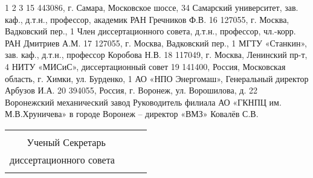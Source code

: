 1	2	3
15	443086, г. Самара, Московское шоссе, 34
Самарский университет, зав. каф., д.т.н., профессор, академик РАН 
Гречников Ф.В.
16	127055, г. Москва, Вадковский пер., 1 	Член диссертационного совета, 
д.т.н., профессор, чл.-корр. РАН 
Дмитриев А.М.
17	127055, г. Москва, Вадковский пер., 1 	МГТУ «Станкин», зав. каф., 
д.т.н., профессор Коробова Н.В.
18	117049, г. Москва, Ленинский пр-т, 4	НИТУ «МИСиС», 
диссертационный совет
19	141400, Россия, Московская область, 
г. Химки, ул. Бурденко, 1	АО «НПО Энергомаш»,
Генеральный директор Арбузов И.А.
20	394055, Россия, г. Воронеж,
ул. Ворошилова, д. 22	Воронежский механический завод
Руководитель филиала АО «ГКНПЦ им. М.В.Хруничева» в городе Воронеж – директор «ВМЗ» Ковалёв С.В.



\begin{center}
	\begin{tabular}[c]{c m{4cm} l}
							&            &                     \\
		Ученый Секретарь     &            &                     \\
		диссертационного совета \ & \hrulefill & \dcSecretaryFullFIO \\
		\dcSecretaryRegalia   &            &
	\end{tabular}
\end{center}

\clearpage
